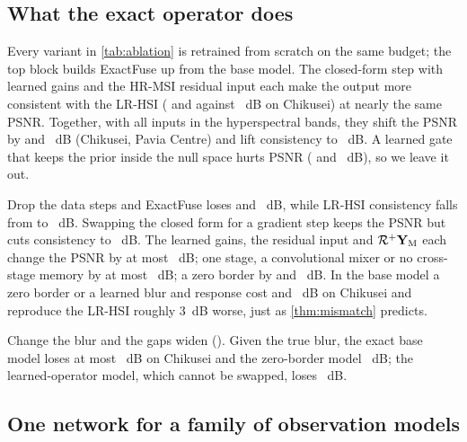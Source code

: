 \documentclass[10pt,twocolumn,letterpaper]{article}
\begin{document}
\subsection{What the exact operator does}
\label{sec:ablation}

Every variant in \cref{tab:ablation} is retrained from scratch on the same budget; the top block builds ExactFuse up from the base model. The closed-form step with learned gains and the HR-MSI residual input each make the output more consistent with the LR-HSI ( and  against ~dB on Chikusei) at nearly the same PSNR. Together, with all inputs in the hyperspectral bands, they shift the PSNR by  and ~dB (Chikusei, Pavia Centre) and lift consistency to ~dB. A learned gate that keeps the prior inside the null space hurts PSNR ( and ~dB), so we leave it out.\par Drop the data steps and ExactFuse loses  and ~dB, while LR-HSI consistency falls from  to ~dB. Swapping the closed form for a gradient step keeps the PSNR but cuts consistency to ~dB. The learned gains, the residual input and $\mathcal{R}^{+}\mathbf{Y}_{\mathrm{M}}$ each change the PSNR by at most ~dB; one stage, a convolutional mixer or no cross-stage memory by at most ~dB; a zero border by  and ~dB. In the base model a zero border or a learned blur and response cost  and ~dB on Chikusei and reproduce the LR-HSI roughly 3~dB worse, just as \cref{thm:mismatch} predicts.

Change the blur and the gaps widen (\supp). Given the true blur, the exact base model loses at most ~dB on Chikusei and the zero-border model ~dB; the learned-operator model, which cannot be swapped, loses ~dB.

\subsection{One network for a family of observation models}
\label{sec:cond}
\end{document}
